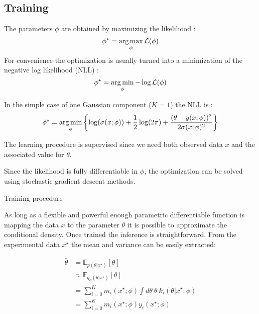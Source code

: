 \subsection{Training}


The parameters $\phi$ are obtained by maximizing the likelihood :
\begin{equation}
    \phi^\star = \operatorname*{arg\,max}_\phi \mathcal L (\phi)
\end{equation}
For convenience the optimization is usually turned into a minimization of the negative log likelihood (NLL) :
\begin{equation}
    \phi^\star = \operatorname*{arg\,min}_\phi - \log \mathcal L (\phi)
\end{equation}

In the simple case of one Gaussian component ($K=1$) the NLL is :
\begin{equation}
    \phi^\star = \operatorname*{arg\,min}_\phi \left\{ \log(\sigma(x;\phi)) + \frac{1}{2}\log(2\pi) + \frac{(\theta - y(x;\phi))^2}{2\sigma(x;\phi)^2} \right\}
\end{equation}

The learning procedure is supervised since we need both observed data $x$ and the associated value for  $\theta$.

Since the likelihood is fully differentiable in $\phi$, the optimization can be solved using stochastic gradient descent methods.

\begin{algorithm}[H]
 \caption{Training procedure}
\end{algorithm}

As long as a flexible and powerful enough parametric differentiable function is mapping the data $x$ to the parameter $\theta$ it is possible to approximate the conditional density.
Once trained the inference is straightforward.
From the experimental data $x^\star$ the mean and variance can be easily extracted:

\begin{align}
    \bar \theta & = \mathbb E_{p(\theta | x^\star)}[\theta] \\
    & \approx \mathbb E_{q_\phi(\theta | x^\star)}[\theta] \\
    & = \sum_{i=0}^K m_i(x^\star ; \phi) \int d\theta ~ \theta ~ k_i(\theta | x^\star ; \phi) \\
    & = \sum_{i=0}^K m_i(x^\star ; \phi) y_i(x^\star ; \phi)
\end{align}

